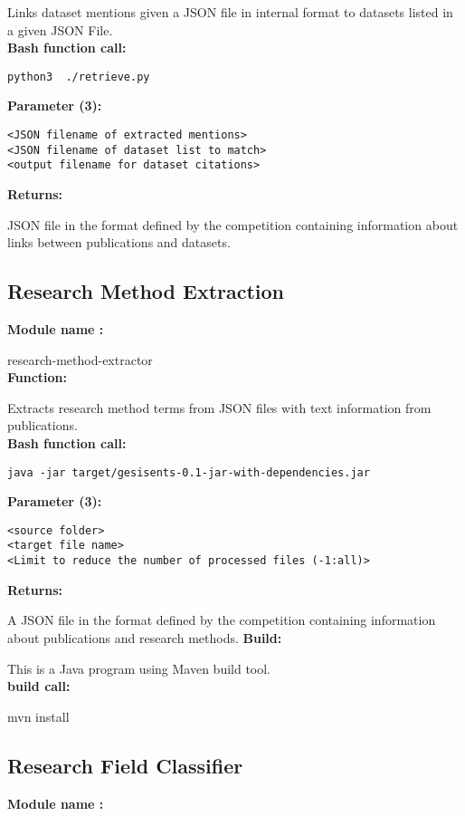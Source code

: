 Links dataset mentions given a JSON file in internal format to datasets listed in a given JSON File.\\
\textbf{Bash function call:}
\begin{lstlisting}
python3  ./retrieve.py
\end{lstlisting}
\textbf{Parameter (3): }
\begin{lstlisting}
<JSON filename of extracted mentions>
<JSON filename of dataset list to match>
<output filename for dataset citations>
\end{lstlisting}
\textbf{Returns: }

JSON file in the format defined by the competition containing information about links between publications and datasets.

\subsection{Research Method Extraction}
\textbf{Module name : }

research-method-extractor\\
\textbf{Function: }

Extracts research method terms from JSON files with text information from publications.\\
\textbf{Bash function call: }
\begin{lstlisting}
java -jar target/gesisents-0.1-jar-with-dependencies.jar
\end{lstlisting}
\textbf{Parameter (3): }
\begin{lstlisting}
<source folder>
<target file name>
<Limit to reduce the number of processed files (-1:all)>
\end{lstlisting}
\textbf{Returns: }

A JSON file in the format defined by the competition containing information about publications and research methods.
\textbf{Build: }

This is a Java program using Maven build tool.\\
\textbf{build call: }

mvn install


\subsection{Research Field Classifier}
\textbf{Module name : }

